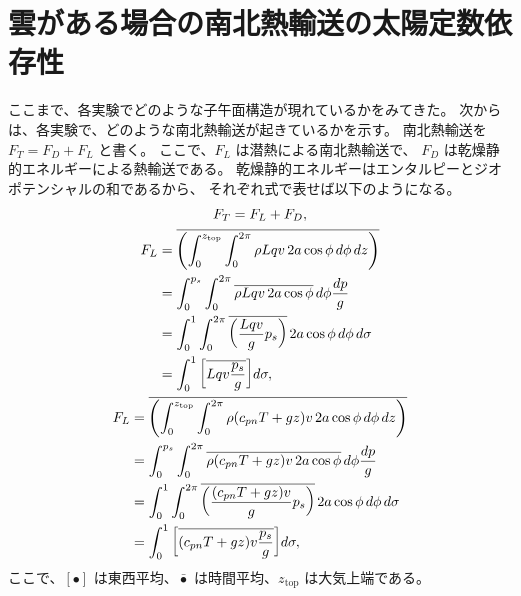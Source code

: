 \documentclass[body]{subfiles}
\begin{document}
\afterpage{\clearpage}

\section{雲がある場合の南北熱輸送の太陽定数依存性}

ここまで、各実験でどのような子午面構造が現れているかをみてきた。
次からは、各実験で、どのような南北熱輸送が起きているかを示す。
南北熱輸送を \(F_T=F_D+F_L\) と書く。
ここで、\(F_L\) は潜熱による南北熱輸送で、
\(F_D\) は乾燥静的エネルギーによる熱輸送である。
乾燥静的エネルギーはエンタルピーとジオポテンシャルの和であるから、
それぞれ式で表せば以下のようになる。
\begin{gather}
	F_T=F_L+F_D,\\
	\begin{split}
		F_L&=\overline{\qty(\int^{z_\text{top}}_0\int^{2\pi}_0 \rho Lqv\,2a\cos\phi\,d\phi\,dz)}\\
		&=\int^{p_s}_0\int^{2\pi}_0 \overline{\rho Lqv\,2a\cos\phi}\,d\phi\frac{dp}{g}\\
		&=\int^1_0\int^{2\pi}_0 \overline{\qty(\frac{Lqv}{g}p_s)}\,2a\cos\phi\,d\phi\,d\sigma\\
		&=\int^1_0 \qty[\overline{Lqv\frac{p_s}{g}}]d\sigma,
	\end{split}\\
	\begin{split}
		F_L&=\overline{\qty(\int^{z_\text{top}}_0\int^{2\pi}_0 \rho (c_{pn}T+gz)v\,2a\cos\phi\,d\phi\,dz)}\\
		&=\int^{p_s}_0\int^{2\pi}_0 \overline{\rho (c_{pn}T+gz)v\,2a\cos\phi}\,d\phi\frac{dp}{g}\\
		&=\int^1_0\int^{2\pi}_0 \overline{\qty(\frac{(c_{pn}T+gz)v}{g}p_s)}\,2a\cos\phi\,d\phi\,d\sigma\\
		&=\int^1_0 \qty[\overline{(c_{pn}T+gz)v\frac{p_s}{g}}]d\sigma,
	\end{split}
\end{gather}
ここで、\([\bullet]\) は東西平均、\(\bar\bullet\) は時間平均、\(z_\text{top}\) は大気上端である。
\end{document}
